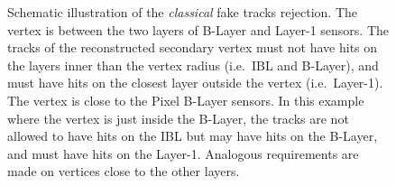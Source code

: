 \documentclass[NOTE, atlasdraft=true, texlive=2018, UKenglish]{\ATLASLATEXPATH atlasdoc}
\begin{document}
\begin{figure}[t]
\begin{center}
\caption{Schematic illustration of the \emph{classical} fake tracks rejection.  The vertex is between the two layers of B-Layer and Layer-1 sensors. The tracks of the reconstructed secondary vertex must not have hits on the layers inner than the vertex radius (i.e.~IBL and B-Layer), and must have hits on the closest layer outside the vertex (i.e.~Layer-1). 
 The vertex is close to the Pixel B-Layer sensors. 
In this example where the vertex is just inside the B-Layer, the tracks are not allowed to have hits on the IBL but may have hits on the B-Layer, and must have hits on the Layer-1.
Analogous requirements are made on vertices close to the other layers.
}
\label{fig:fakeRejScheme}
\end{center}
\end{figure}
\end{document}
